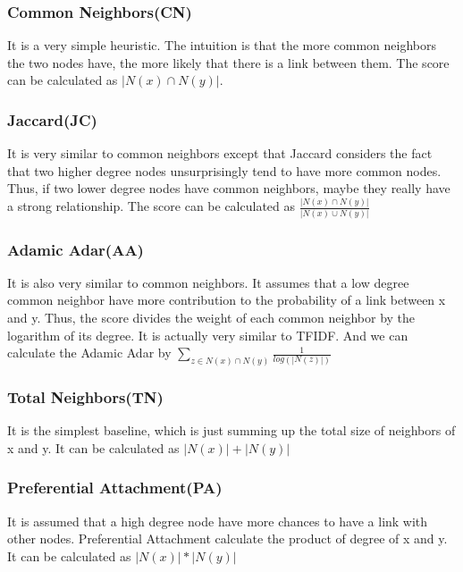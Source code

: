 \documentclass[12pt]{article}
\begin{document}
	\subsubsection{Common Neighbors(CN)}
	It is a very simple heuristic. The intuition is that the more common neighbors the two nodes have, the more likely that there is a link between them. The score can be calculated as $|N(x) \cap N(y)|$.
	\subsubsection{Jaccard(JC)}
	It is very similar to common neighbors except that Jaccard considers the fact that two higher degree nodes unsurprisingly tend to have more common nodes. Thus, if two lower degree nodes have common neighbors, maybe they really have a strong relationship. The score can be calculated as $\frac{|N(x) \cap N(y)|}{|N(x) \cup N(y)|}$
	\subsubsection{Adamic Adar(AA)}
	It is also very similar to common neighbors. It assumes that a low degree common neighbor have more contribution to the probability of a link between x and y. Thus, the score divides the weight of each common neighbor by the logarithm of its degree. It is actually very similar to TFIDF. And we can calculate the Adamic Adar by $\sum_{z \in N(x) \cap N(y)}{\frac{1}{log(|N(z)|)}}$
	\subsubsection{Total Neighbors(TN)}
	It is the simplest baseline, which is just summing up the total size of neighbors of x and y. It can be calculated as $|N(x)| + |N(y)|$
	\subsubsection{Preferential Attachment(PA)}
	It is assumed that a high degree node have more chances to have a link with other nodes. Preferential Attachment calculate the product of degree of x and y. It can be calculated as $|N(x)| * |N(y)|$
\end{document}
